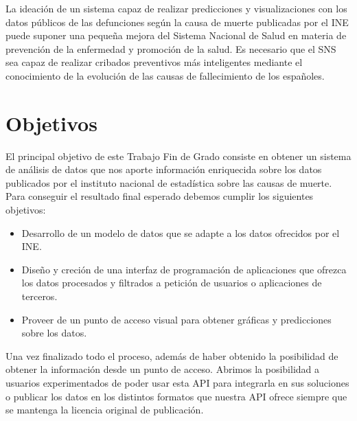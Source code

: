 La ideación de un sistema capaz de realizar predicciones y visualizaciones con los datos públicos de las defunciones según 
la causa de muerte publicadas por el INE puede suponer una pequeña mejora del Sistema Nacional de Salud en materia de 
prevención de la enfermedad y promoción de la salud. Es necesario que el SNS sea capaz de realizar cribados preventivos 
más inteligentes mediante el conocimiento de la evolución de las causas de fallecimiento de los españoles.


\section{Objetivos}
El principal objetivo de este Trabajo Fin de Grado consiste en obtener un sistema de análisis de datos que nos aporte
información enriquecida sobre los datos publicados por el instituto nacional de estadística sobre las causas de muerte. 
Para conseguir el resultado final esperado debemos cumplir los siguientes objetivos:
\begin{itemize}
    \item Desarrollo de un modelo de datos que se adapte a los datos ofrecidos por el INE.
    \item Diseño y creción de una interfaz de programación de aplicaciones que ofrezca los datos procesados y 
filtrados a petición de usuarios o aplicaciones de terceros.
    \item Proveer de un punto de acceso visual para obtener gráficas y predicciones sobre los datos.
\end{itemize}

Una vez finalizado todo el proceso, además de haber obtenido la posibilidad de obtener la información 
desde un punto de acceso. Abrimos la posibilidad a usuarios experimentados de poder usar esta API para 
integrarla en sus soluciones o publicar los datos en los distintos formatos que nuestra API ofrece 
siempre que se mantenga la licencia original de publicación.

